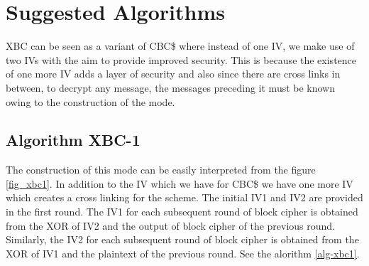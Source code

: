 \documentclass[conference]{IEEEtran}
\begin{document}
%



\section{Suggested Algorithms}

XBC can be seen as a variant of CBC\$ where instead of one IV, we make use of two IVs with the aim to provide improved security. This is because the existence of one more IV adds a layer of security and also since there are cross links in between, to decrypt any message, the messages preceding it must be known owing to the construction of the mode.

\subsection{Algorithm XBC-1}

The construction of this mode can be easily interpreted from the figure \ref{fig_xbc1}. In addition to the IV which we have for CBC\$ we have one more IV which creates a cross linking for the scheme. The initial IV1 and IV2 are provided in the first round. The IV1 for each subsequent round of block cipher is obtained from the XOR of IV2 and the output of block cipher of the previous round. Similarly, the IV2 for each subsequent round of block cipher is obtained from the XOR of IV1 and the plaintext of the previous round. See the alorithm \ref{alg-xbc1}.
\end{document}
